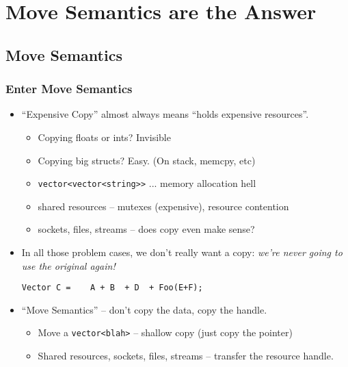 
\lyxframeend{}\section[The Solution]{Move Semantics are the Answer}

\subsection[Move Semantics]{Move Semantics}\lyxframeend{}


\begin{frame}[fragile]
\frametitle{Enter Move Semantics}

\begin{itemize}[<+->]
\item ``Expensive Copy'' almost always means ``holds expensive resources''.

      \begin{itemize}[<+->]
      \item Copying floats or ints? Invisible
      \item Copying big structs? Easy.  (On stack, memcpy, etc)
\vskip 6pt
      \item \texttt{vector<vector<string>{}>}  ...  memory allocation hell
      \item shared resources -- mutexes (expensive), resource contention
      \item sockets, files, streams -- does copy even make sense?
      \end{itemize}

\vskip 6pt
\pause

\item In all those problem cases, we don't really want a copy: \emph{we're never going to
  use the original again!}
\begin{verbatim}
Vector C =    A + B  + D  + Foo(E+F);
\end{verbatim}


\vskip 6pt
\pause

\item ``Move Semantics'' -- don't copy the data, copy the handle.

    \begin{itemize}[<+->]
    \item Move a \texttt{vector<blah>} -- shallow copy (just copy the pointer)
    \item Shared resources, sockets, files, streams -- transfer the
    resource handle.

    \end{itemize}


\end{itemize}
\end{frame}



